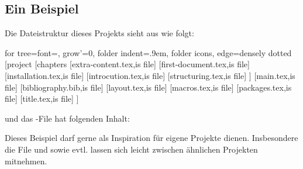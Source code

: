 \subsection{Ein Beispiel}
Die Dateistruktur dieses Projekts sieht aus wie folgt:
\begin{center}
	\begin{forest}
	for tree={font=\sffamily, grow'=0,
	folder indent=.9em, folder icons,
	edge=densely dotted}
	[project
		[chapters
			[extra-content.tex,is file]
			[first-document.tex,is file]
			[installation.tex,is file]
			[introcution.tex,is file]
			[structuring.tex,is file]
		]
		[main.tex,is file]
		[bibliography.bib,is file]
		[layout.tex,is file]
		[macros.tex,is file]
		[packages.tex,is file]
		[title.tex,is file]
	]
	\end{forest}
\end{center}
und das -File hat folgenden Inhalt:
Dieses Beispiel darf gerne als Inspiration für eigene Projekte dienen.
Insbesondere die File  und  sowie evtl.  lassen sich leicht zwischen ähnlichen Projekten mitnehmen.

